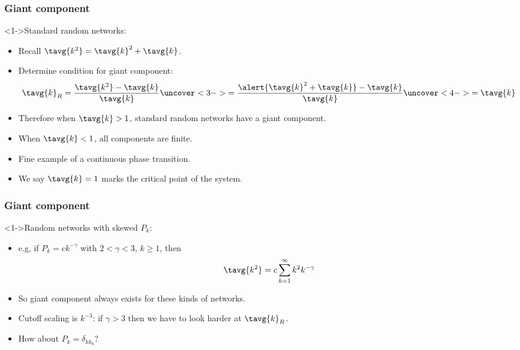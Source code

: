 \begin{frame}[label=]
  \frametitle{Giant component}

  \begin{block}<1->{Standard random networks:}
    \begin{itemize}
    \item<1-> 
      Recall $\tavg{k^2} = \tavg{k}^2 + \tavg{k}$.
    \item<2->
      Determine condition for giant component:
      $$
      \tavg{k}_R = 
      \frac{\tavg{k^2} - \tavg{k}}
      {\tavg{k}}
      \uncover<3->{
        =
      \frac{\alert{\tavg{k}^2 + \tavg{k}} - \tavg{k}}
      {\tavg{k}}
      }
      \uncover<4->{
        = \tavg{k}
      }
      $$
    \item<5->
      Therefore when $\tavg{k} > 1$,
      standard random networks have a giant component.
    \item<6->
      When $\tavg{k} < 1$,
      all components are finite.
    \item<7->
      Fine example of a continuous
      {phase transition}.
    \item<8->
      We say $\tavg{k}=1$ marks the critical point of the system.
    \end{itemize}
  \end{block}
  
\end{frame}

\begin{frame}[label=]
  \frametitle{Giant component}

  \begin{block}<1->{Random networks with skewed $P_k$:}
    \begin{itemize}
    \item<1-> 
      e.g, if $P_k = c k^{-\gamma}$ with $2 < \gamma < 3$, $k \ge 1$, 
      then
      $$
      \tavg{k^2} 
      = c \sum_{k=1}^{\infty}
      k^2 k^{-\gamma}
      $$
    \item<6->
      So giant component \alert{always exists}
      for these kinds of networks.
    \item<7->
      Cutoff scaling is $k^{-3}$: if $\gamma>3$ then
      we have to look harder at $\tavg{k}_R$.
    \item<8->
      How about $P_k = \delta_{kk_0}$?
    \end{itemize}
  \end{block}
  
\end{frame}

